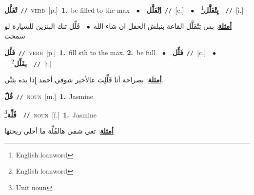 \documentclass[10pt,a4paper,twoside]{article} %
\begin{document}
\begin{multicols}{2}
{\setlength\topsep{0pt}\textbf{\foreignlanguage{arabic}{تْفَلَّل}}\ {\color{gray}\texttt{//}\color{black}}\ \textsc{verb}\ [p.]\ \textbf{1.}~be filled to the max\ \ $\bullet$\ \ \setlength\topsep{0pt}\textbf{\foreignlanguage{arabic}{اِتْفَلَّل}}\ {\color{gray}\texttt{//}\color{black}}\ [c.]\ \ $\bullet$\ \ \setlength\topsep{0pt}\textbf{\foreignlanguage{arabic}{يِتْفَلَّل}}\footnote{English loanword}\ \ {\color{gray}\texttt{//}\color{black}}\ [i.]\  \begin{flushright}\color{gray}\foreignlanguage{arabic}{\textbf{\underline{\foreignlanguage{arabic}{أمثلة}}}: بس تِتْفَلَّل القاعة بنبلش الحفل ان شاء الله\ $\bullet$\ \  فَلِّل تنك البنزين للسيارة لو سمحت}\end{flushright}\color{black}} \vspace{2mm}

{\setlength\topsep{0pt}\textbf{\foreignlanguage{arabic}{فَلَّل}}\ {\color{gray}\texttt{//}\color{black}}\ \textsc{verb}\ [p.]\ \textbf{1.}~fill sth to the max.  \textbf{2.}~be full\ \ $\bullet$\ \ \setlength\topsep{0pt}\textbf{\foreignlanguage{arabic}{فَلِّل}}\ {\color{gray}\texttt{//}\color{black}}\ [c.]\ \ $\bullet$\ \ \setlength\topsep{0pt}\textbf{\foreignlanguage{arabic}{يفَلِّل}}\footnote{English loanword}\ \ {\color{gray}\texttt{//}\color{black}}\ [i.]\  \begin{flushright}\color{gray}\foreignlanguage{arabic}{\textbf{\underline{\foreignlanguage{arabic}{أمثلة}}}: بصراحة أنا فَلِّلِت عالأخير شوفي أحمد إِذا بده يثنِّي.}\end{flushright}\color{black}} \vspace{2mm}

{\setlength\topsep{0pt}\textbf{\foreignlanguage{arabic}{فُلّ}}\ {\color{gray}\texttt{//}\color{black}}\ \textsc{noun}\ [m.]\ \textbf{1.}~Jasmine\ } \vspace{2mm}

{\setlength\topsep{0pt}\textbf{\foreignlanguage{arabic}{فُلِّة}}\footnote{Unit noun}\ \ {\color{gray}\texttt{//}\color{black}}\ \textsc{noun}\ [f.]\ \textbf{1.}~Jasmine\  \begin{flushright}\color{gray}\foreignlanguage{arabic}{\textbf{\underline{\foreignlanguage{arabic}{أمثلة}}}: تعي شمي هالفُلِّة ما أحلى ريحتها}\end{flushright}\color{black}} \vspace{2mm}


\end{multicols}
\end{document}
